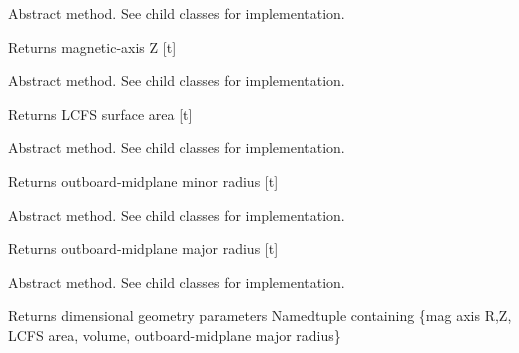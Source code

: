 \documentclass[letterpaper,10pt,english]{sphinxmanual}
\begin{document}
\begin{fulllineitems}
\begin{fulllineitems}
\label{eqtools:eqtools.core.Equilibrium.getMagZ}
Abstract method.  See child classes for implementation.

Returns magnetic-axis Z {[}t{]}

\end{fulllineitems}


\begin{fulllineitems}
\label{eqtools:eqtools.core.Equilibrium.getAreaLCFS}
Abstract method.  See child classes for implementation.

Returns LCFS surface area {[}t{]}

\end{fulllineitems}


\begin{fulllineitems}
\label{eqtools:eqtools.core.Equilibrium.getAOut}
Abstract method.  See child classes for implementation.

Returns outboard-midplane minor radius {[}t{]}

\end{fulllineitems}


\begin{fulllineitems}
\label{eqtools:eqtools.core.Equilibrium.getRmidOut}
Abstract method.  See child classes for implementation.

Returns outboard-midplane major radius {[}t{]}

\end{fulllineitems}


\begin{fulllineitems}
\label{eqtools:eqtools.core.Equilibrium.getGeometry}
Abstract method.  See child classes for implementation.

Returns dimensional geometry parameters
Namedtuple containing \{mag axis R,Z, LCFS area, volume, outboard-midplane major radius\}


\end{fulllineitems}
\end{fulllineitems}
\end{document}
